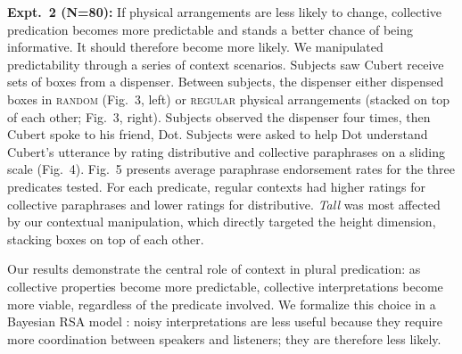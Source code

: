 \documentclass[12pt]{article}
\begin{document}
\textbf{Expt.~2 (N=80):} If physical arrangements are less likely to change, collective predication becomes more predictable and stands a better chance of being informative. It should therefore become more likely. We manipulated predictability through a series of context scenarios. Subjects saw Cubert receive sets of boxes from a dispenser. Between subjects, the dispenser either dispensed boxes in \textsc{random} (Fig.~3, left) or \textsc{regular} physical arrangements (stacked on top of each other; Fig.~3, right). Subjects observed the dispenser four times, then Cubert spoke to his friend, Dot. Subjects were asked to help Dot understand Cubert's utterance by rating distributive and collective paraphrases on a sliding scale (Fig.~4). Fig.~5 presents average paraphrase endorsement rates for the three predicates tested. For each predicate, regular contexts had higher ratings for collective paraphrases and lower ratings for distributive. \textit{Tall} was most affected by our contextual manipulation, which directly targeted the height dimension, stacking boxes on top of each other. 

 Our results demonstrate the central role of context in plural predication: as collective properties become more predictable, collective interpretations become more viable, regardless of the predicate involved. We formalize this choice in a Bayesian RSA model \citep{frankgoodman2012,lassitergoodman2013}: noisy interpretations are less useful because they require more coordination between speakers and listeners; they are therefore less likely.


		




\newpage



\end{document}
